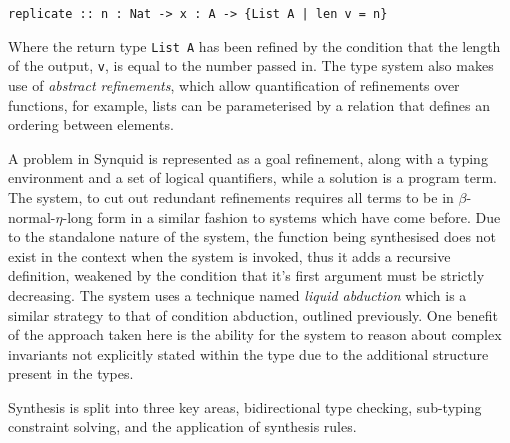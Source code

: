 \documentclass[a4paper]{article}
\begin{document}
\texttt{replicate :: n : Nat -> x : A -> \{List A | len v = n\}}

Where the 
return type \texttt{List A} has been refined by the condition that the length of the output, \texttt{v}, is equal to the number passed in.
The type system also makes use of \emph{abstract refinements}, which allow quantification of refinements over functions, for
example, lists can be parameterised by a relation that defines an ordering between elements. 

A problem in Synquid is represented as a goal refinement, along with a typing environment and a set of logical quantifiers, 
while a solution is a program term. The system, to cut out redundant refinements requires all terms to be in \(\beta\)-normal-\(\eta\)-long 
form in a similar fashion to systems which have come before. Due to the standalone nature of the system, the function 
being synthesised does not exist in the context when the system is invoked, thus it adds a recursive definition, weakened by 
the condition that it's first argument must be strictly decreasing. The system uses a technique named \emph{liquid abduction} which 
is a similar strategy to that of condition abduction, outlined previously. One benefit of the approach taken here is the ability for the system 
to reason about complex invariants not explicitly stated within the type due to the additional structure present in the types.

Synthesis is split into three key areas, bidirectional type checking, sub-typing constraint solving, and the application of synthesis rules.
\end{document}
